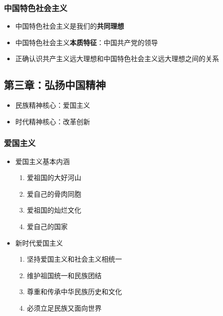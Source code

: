 \documentclass[
]{article}
\begin{document}
\hypertarget{header-n82}{%
\subsubsection{中国特色社会主义}\label{header-n82}}

\begin{itemize}
\item
  中国特色社会主义是我们的\textbf{共同理想}
\item
  中国特色社会主义\textbf{本质特征}：中国共产党的领导
\item
  正确认识共产主义远大理想和中国特色社会主义远大理想之间的关系
\end{itemize}

\hypertarget{header-n90}{%
\subsection{第三章：弘扬中国精神}\label{header-n90}}

\begin{itemize}
\item
  民族精神核心：爱国主义
\item
  时代精神核心：改革创新
\end{itemize}

\hypertarget{header-n96}{%
\subsubsection{爱国主义}\label{header-n96}}

\begin{itemize}
\item
  爱国主义基本内涵

  \begin{enumerate}
  \def\labelenumi{\arabic{enumi}.}
  \item
    爱祖国的大好河山
  \item
    爱自己的骨肉同胞
  \item
    爱祖国的灿烂文化
  \item
    爱自己的国家
  \end{enumerate}
\item
  新时代爱国主义

  \begin{enumerate}
  \def\labelenumi{\arabic{enumi}.}
  \item
    坚持爱国主义和社会主义相统一
  \item
    维护祖国统一和民族团结
  \item
    尊重和传承中华民族历史和文化
  \item
    必须立足民族又面向世界
  \end{enumerate}
\end{itemize}
\end{document}
